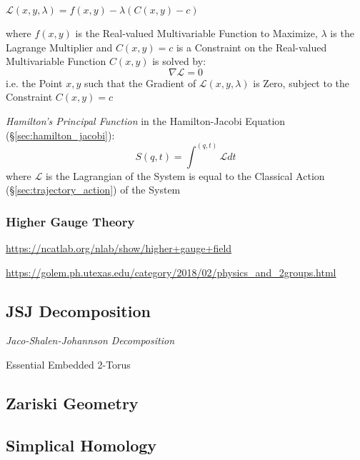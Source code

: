 $\mathcal{L}(x,y,\lambda) = f(x,y) - \lambda (C(x,y) - c)$

where $f(x,y)$ is the Real-valued Multivariable Function to Maximize, $\lambda$
is the Lagrange Multiplier and $C(x,y) = c$ is a Constraint on the Real-valued
Multivariable Function $C(x,y)$ is solved by:
\[
  \nabla\mathcal{L} = 0
\]
i.e. the Point $x,y$ such that the Gradient of $\mathcal{L}(x,y,\lambda)$ is
Zero, subject to the Constraint $C(x,y) = c$

\emph{Hamilton's Principal Function} in the Hamilton-Jacobi Equation
(\S\ref{sec:hamilton_jacobi}):
\[
  S(q,t) = \int^{(q,t)} \mathcal{L} dt
\]
where $\mathcal{L}$ is the Lagrangian of the System is equal to the Classical
Action (\S\ref{sec:trajectory_action}) of the System



\subsubsection{Higher Gauge Theory}\label{sec:higher_gauge_theory}

\url{https://ncatlab.org/nlab/show/higher+gauge+field}

\url{https://golem.ph.utexas.edu/category/2018/02/physics_and_2groups.html}



\subsection{JSJ Decomposition}\label{sec:jsj_decomposition}

\emph{Jaco-Shalen-Johannson Decomposition}

Essential Embedded 2-Torus



\subsection{Zariski Geometry}\label{sec:zariski_geometry}

\subsection{Simplical Homology}\label{sec:simplical_homology}

